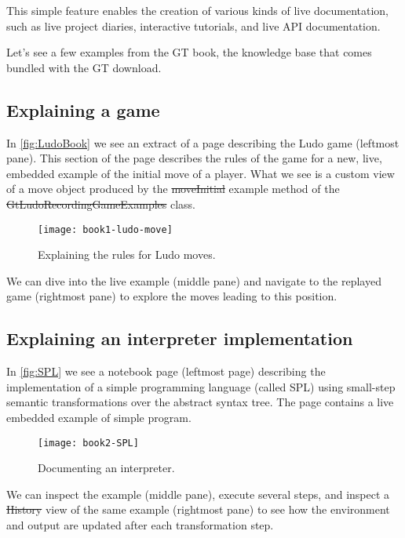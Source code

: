 \documentclass[acmsmall,screen,authorversion,nonacm]{acmart} %
\begin{document}
This simple feature enables the creation of various kinds of live documentation, such as live project diaries, interactive tutorials, and live API documentation.

Let's see a few examples from the GT book, the knowledge base that comes bundled with the GT download.

\subsection{Explaining a game}
In \autoref{fig:LudoBook} we see an extract of a page describing the Ludo game (leftmost pane).
This section of the page describes the rules of the game for a new, live, embedded example of the initial move of a player.
What we see is a custom view of a move object produced by the \st{moveInitial} example method of the \st{GtLudoRecordingGameExamples} class.
\begin{figure}[h]
  \texttt{[image: book1-ludo-move]}
  \caption{Explaining the rules for Ludo moves.}
  \label{fig:LudoBook}
\end{figure}
We can dive into the live example (middle pane) and navigate to the replayed game (rightmost pane) to explore the moves leading to this position.

\subsection{Explaining an interpreter implementation}
In \autoref{fig:SPL} we see a notebook page (leftmost page) describing the implementation of a simple programming language (called SPL) using small-step semantic transformations over the abstract syntax tree.
The page contains a live embedded example of simple program.
\begin{figure}[h]
  \texttt{[image: book2-SPL]}
  \caption{Documenting an interpreter.}
  \label{fig:SPL}
\end{figure}
We can inspect the example (middle pane), execute several steps, and inspect a \st{History} view of the same example (rightmost pane) to see how the environment and output are updated after each transformation step.

\end{document}
